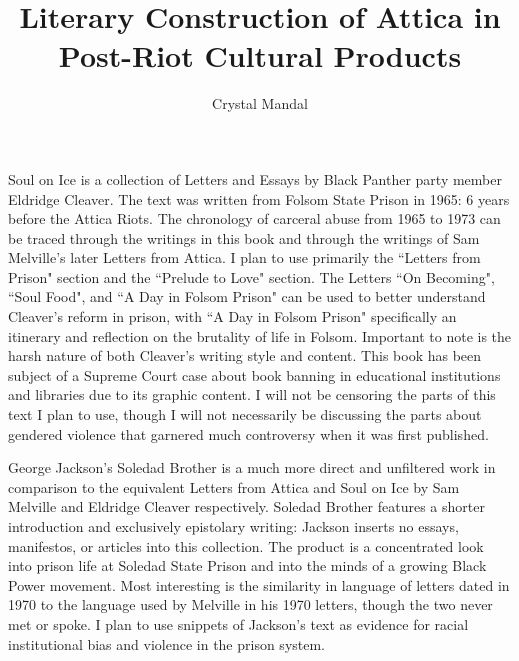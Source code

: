 \documentclass[14pt, letterpaper]{article}
\title{ \vspace*{-72pt} Literary Construction of Attica in Post-Riot Cultural Products }
\author{Crystal Mandal}
\date{}
\begin{document}
\maketitle


\begin{adjustwidth}{2.5em}{0pt}

	Soul on Ice is a collection of Letters and Essays by Black Panther 
	party member Eldridge Cleaver. The text was written from Folsom 
	State Prison in 1965: 6 years before the Attica Riots. The chronology 
	of carceral abuse from 1965 to 1973 can be traced through the writings  
	in this book and through the writings of Sam Melville's later 
	Letters from Attica. I plan to use primarily the ``Letters from 
	Prison" section and the ``Prelude to Love" section. The Letters ``On 
	Becoming", ``Soul Food", and ``A Day in Folsom Prison" can be used 
	to better understand Cleaver's reform in prison, with ``A Day in Folsom 
	Prison" specifically an itinerary and reflection on the brutality 
	of life in Folsom. Important to note is the harsh nature of both 
	Cleaver's writing style and content. This book has been subject of 
	a Supreme Court case about book banning in educational institutions and 
	libraries due to its graphic content. I will not be censoring the parts 
	of this text I plan to use, though I will not necessarily be discussing 
	the parts about gendered violence that garnered much controversy when it 
	was first published.

\end{adjustwidth}

\clearpage


\begin{adjustwidth}{2.5ex}{0pt}

	George Jackson's Soledad Brother is a much more direct and unfiltered
	work in comparison to the equivalent Letters from Attica and Soul 
	on Ice by Sam Melville and Eldridge Cleaver respectively. Soledad 
	Brother features a shorter introduction and exclusively epistolary 
	writing: Jackson inserts no essays, manifestos, or articles into 
	this collection. The product is a concentrated look into prison 
	life at Soledad State Prison and into the minds of a growing Black 
	Power movement. Most interesting is the similarity in language of 
	letters dated in 1970 to the language used by Melville in his 1970 
	letters, though the two never met or spoke. I plan to use snippets 
	of Jackson's text as evidence for racial institutional bias and 
	violence in the prison system.

\end{adjustwidth}
\end{document}
